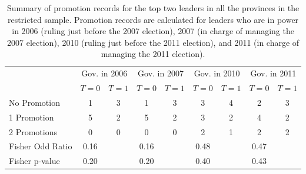\begin{table}[ht]
\centering
\begin{tabular}{lcccccccc}
   & \multicolumn{2}{c}{Gov. in 2006} & \multicolumn{2}{c}{Gov. in 2007} & \multicolumn{2}{c}{Gov. in 2010} & \multicolumn{2}{c}{Gov. in 2011} \\
 & $T = 0$ & $T = 1$ & $T = 0$ & $T = 1$ & $T = 0$ & $T = 1$ & $T = 0$ & $T = 1$ \\
 \hline
No Promotion & 1 & 3 & 1 & 3 & 3 & 4 & 2 & 3 \\ 
  1 Promotion & 5 & 2 & 5 & 2 & 3 & 2 & 4 & 2 \\ 
  2 Promotions & 0 & 0 & 0 & 0 & 2 & 1 & 2 & 2 \\ 
   \hline
Fisher Odd Ratio & 0.16 &  & 0.16 &  & 0.48 &  & 0.47 &  \\ 
  Fisher p-value & 0.20 &  & 0.20 &  & 0.40 &  & 0.43 &  \\ 
  \end{tabular}
\caption{Summary of promotion records for the top two leaders in all the provinces in the restricted sample. 
             Promotion records are calculated for leaders who are in power in 2006 (ruling just before the 2007 election), 2007 (in charge of managing the 2007 election),
             2010 (ruling just before the 2011 election), and 2011 (in charge of managing the 2011 election).} 
\label{tab:promo_mech}
\end{table}
